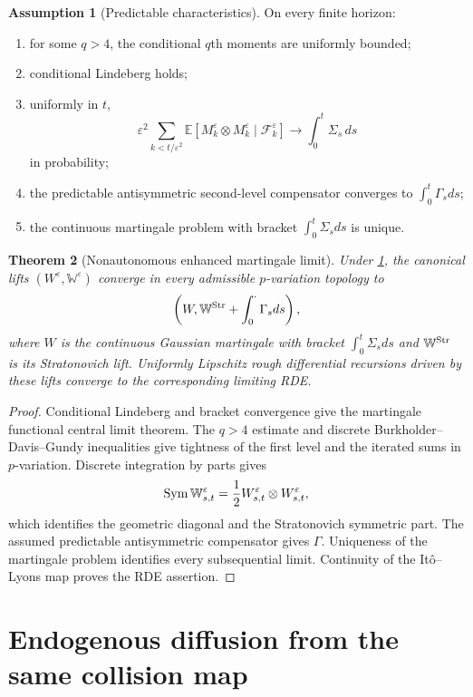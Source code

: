 \documentclass[11pt,reqno]{amsart}
\newtheorem{theorem}{Theorem}[section]
\theoremstyle{definition}
\newtheorem{assumption}[theorem]{Assumption}
\theoremstyle{remark}
\newcommand{\E}{\mathbb E}
\newcommand{\F}{\mathcal F}
\begin{document}
\begin{assumption}[Predictable characteristics]\label{ass:chars}
On every finite horizon:
\begin{enumerate}[label=(\roman*)]
\item for some $q>4$, the conditional $q$th moments are uniformly bounded;
\item conditional Lindeberg holds;
\item uniformly in $t$,
\[
 \varepsilon^2\sum_{k<t/\varepsilon^2}
 \E[M_k^\varepsilon\otimes M_k^\varepsilon\mid\F_k^\varepsilon]
 \longrightarrow\int_0^t\Sigma_s\,ds
\]
in probability;
\item the predictable antisymmetric second-level compensator converges to
$\int_0^t\Gamma_sds$;
\item the continuous martingale problem with bracket
$\int_0^t\Sigma_sds$ is unique.
\end{enumerate}
\end{assumption}

\begin{theorem}[Nonautonomous enhanced martingale limit]\label{thm:rough}
Under \cref{ass:chars}, the canonical lifts
$(W^\varepsilon,\mathbb W^\varepsilon)$ converge in every admissible
$p$-variation topology to
\[
 \left(W,\mathbb W^{\rm Str}+\int_0^{\cdot}\Gamma_sds\right),
\]
where $W$ is the continuous Gaussian martingale with bracket
$\int_0^t\Sigma_sds$ and $\mathbb W^{\rm Str}$ is its Stratonovich lift.
Uniformly Lipschitz rough differential recursions driven by these lifts
converge to the corresponding limiting RDE.
\end{theorem}

\begin{proof}
Conditional Lindeberg and bracket convergence give the martingale functional
central limit theorem.  The $q>4$ estimate and discrete
Burkholder--Davis--Gundy inequalities give tightness of the first level and the
iterated sums in $p$-variation.  Discrete integration by parts gives
\[
 \operatorname{Sym}\mathbb W^\varepsilon_{s,t}
 ={1\over2}W^\varepsilon_{s,t}\otimes W^\varepsilon_{s,t},
\]
which identifies the geometric diagonal and the Stratonovich symmetric part.
The assumed predictable antisymmetric compensator gives $\Gamma$.  Uniqueness
of the martingale problem identifies every subsequential limit.  Continuity of
the It\^o--Lyons map proves the RDE assertion.
\end{proof}

\section{Endogenous diffusion from the same collision map}
\end{document}
